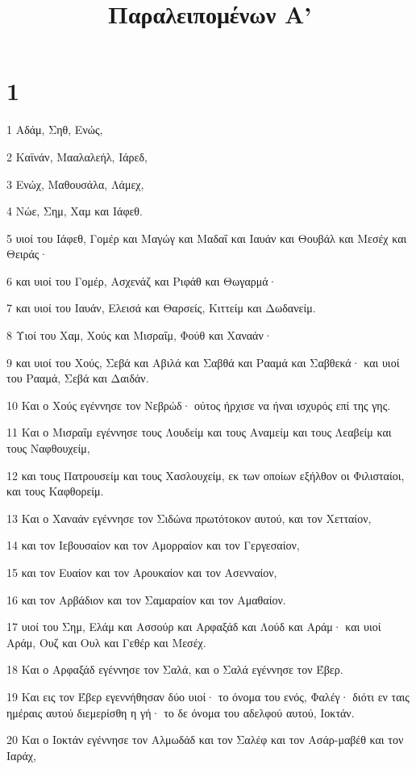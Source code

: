 

\title{Παραλειπομένων Α'}


\chapter{1}

\par 1 Αδάμ, Σηθ, Ενώς,
\par 2 Καϊνάν, Μααλαλεήλ, Ιάρεδ,
\par 3 Ενώχ, Μαθουσάλα, Λάμεχ,
\par 4 Νώε, Σημ, Χαμ και Ιάφεθ.
\par 5 υιοί του Ιάφεθ, Γομέρ και Μαγώγ και Μαδαΐ και Ιαυάν και Θουβάλ και Μεσέχ και Θειράς·
\par 6 και υιοί του Γομέρ, Ασχενάζ και Ριφάθ και Θωγαρμά·
\par 7 και υιοί του Ιαυάν, Ελεισά και Θαρσείς, Κιττείμ και Δωδανείμ.
\par 8 Υιοί του Χαμ, Χούς και Μισραΐμ, Φούθ και Χαναάν·
\par 9 και υιοί του Χούς, Σεβά και Αβιλά και Σαβθά και Ρααμά και Σαβθεκά· και υιοί του Ρααμά, Σεβά και Δαιδάν.
\par 10 Και ο Χούς εγέννησε τον Νεβρώδ· ούτος ήρχισε να ήναι ισχυρός επί της γης.
\par 11 Και ο Μισραΐμ εγέννησε τους Λουδείμ και τους Αναμείμ και τους Λεαβείμ και τους Ναφθουχείμ,
\par 12 και τους Πατρουσείμ και τους Χασλουχείμ, εκ των οποίων εξήλθον οι Φιλισταίοι, και τους Καφθορείμ.
\par 13 Και ο Χαναάν εγέννησε τον Σιδώνα πρωτότοκον αυτού, και τον Χετταίον,
\par 14 και τον Ιεβουσαίον και τον Αμορραίον και τον Γεργεσαίον,
\par 15 και τον Ευαίον και τον Αρουκαίον και τον Ασενναίον,
\par 16 και τον Αρβάδιον και τον Σαμαραίον και τον Αμαθαίον.
\par 17 υιοί του Σημ, Ελάμ και Ασσούρ και Αρφαξάδ και Λούδ και Αράμ· και υιοί Αράμ, Ουζ και Ουλ και Γεθέρ και Μεσέχ.
\par 18 Και ο Αρφαξάδ εγέννησε τον Σαλά, και ο Σαλά εγέννησε τον Έβερ.
\par 19 Και εις τον Έβερ εγεννήθησαν δύο υιοί· το όνομα του ενός, Φαλέγ· διότι εν ταις ημέραις αυτού διεμερίσθη η γή· το δε όνομα του αδελφού αυτού, Ιοκτάν.
\par 20 Και ο Ιοκτάν εγέννησε τον Αλμωδάδ και τον Σαλέφ και τον Ασάρ-μαβέθ και τον Ιαράχ,
